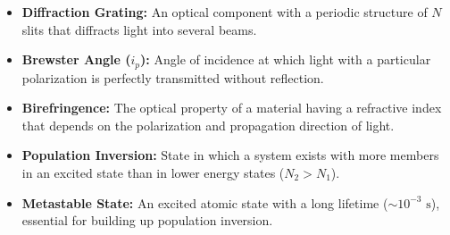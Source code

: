 \documentclass[12pt,a4paper]{article}
\begin{document}
\begin{tcolorbox}[defbox, title={\textbf{One-Line Definitions}}]
\begin{itemize}[leftmargin=*, itemsep=2pt]
  \item \textbf{Diffraction Grating:} An optical component with a periodic structure of $N$ slits that diffracts light into several beams.
  \item \textbf{Brewster Angle ($i_p$):} Angle of incidence at which light with a particular polarization is perfectly transmitted without reflection.
  \item \textbf{Birefringence:} The optical property of a material having a refractive index that depends on the polarization and propagation direction of light.
  \item \textbf{Population Inversion:} State in which a system exists with more members in an excited state than in lower energy states ($N_2 > N_1$).
  \item \textbf{Metastable State:} An excited atomic state with a long lifetime ($\sim 10^{-3}\text{ s}$), essential for building up population inversion.
\end{itemize}
\end{tcolorbox}
\end{document}
